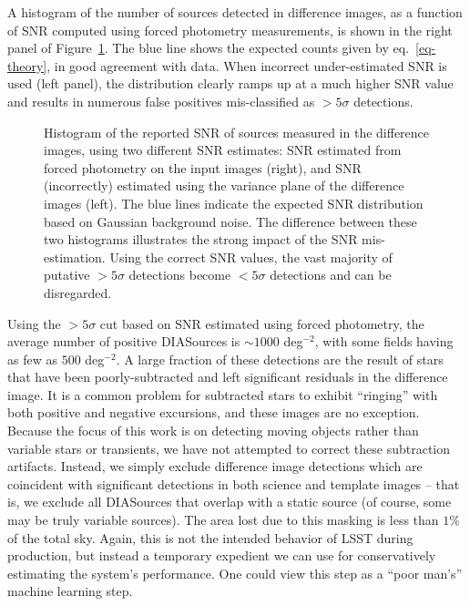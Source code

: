 A histogram of the number of sources detected in difference images, as a function
of SNR computed using forced photometry measurements, is shown in the right panel 
of Figure~\ref{fig:snr_comparison}. The blue line shows the expected counts given
by eq.~\ref{eq-theory}, in good agreement with data. When incorrect under-estimated 
SNR is used (left panel), the distribution clearly ramps up at a much higher SNR value 
and results in numerous false positives mis-classified as $>5 \sigma$ detections.


\begin{figure}
  \centering
  \caption{
  Histogram of the reported SNR of sources measured in the difference images, 
  using two different SNR estimates: SNR estimated from forced photometry on
  the input images (right), and SNR (incorrectly) estimated using the variance plane
  of the difference images (left). The blue lines indicate the expected SNR distribution
  based on Gaussian background noise. The difference between these two histograms
  illustrates the strong impact of the SNR mis-estimation. Using the correct SNR values, 
  the vast majority of putative $>5 \sigma$ detections become $<5 \sigma$ detections
  and can be disregarded.
  }
  \label{fig:snr_comparison}
\end{figure}


Using the $>5\sigma$ cut based on SNR estimated using forced photometry, 
the average number of positive DIASources is $\sim 1000$ deg$^{-2}$,
with some fields having as few as $500$ deg$^{-2}$. A large fraction of
these detections are the result of stars that have been poorly-subtracted and
left significant residuals in the difference image. It is a common problem for
subtracted stars to exhibit ``ringing'' with both positive and negative
excursions, and these images are no exception. Because the focus of this work
is on detecting moving objects rather than variable stars or transients, we have
not attempted to correct these subtraction artifacts. Instead, we simply exclude
difference image detections which are coincident with significant detections in
both science and template images -- that is, we exclude all DIASources that
overlap with a static source (of course, some may be truly variable sources). 
The area lost due to this masking is less than $1\%$ of the total sky. Again, this 
is not the intended behavior of LSST during production, but instead a temporary 
expedient we can use for conservatively estimating the system's performance. 
One could view this step as a ``poor man's'' machine learning step. 

